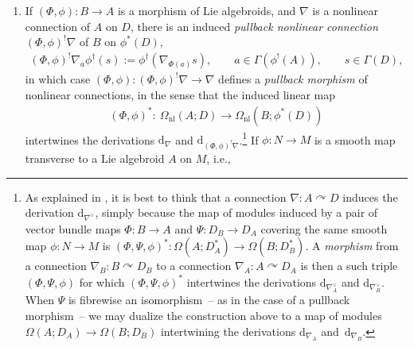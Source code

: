 \documentclass[pdftex]{sigma}
\numberwithin{equation}{section}
\newcommand{\rmap}{\longrightarrow}
\newcommand{\acts}{\curvearrowright}
\newcommand{\C}{\mathbb{C}}
\newcommand{\dd}{\mathrm{d}}
\newcommand{\8}{\infty}
\begin{document}
\begin{enumerate}
\begin{gather*}
\end{gather*}and it is always the case that $\dd_{\nabla}R_{\nabla} = 0$. If $R_{\nabla}=0$, we call $\nabla$ a \emph{nonlinear representation}. Because the supertrace $\operatorname{Tr}_s(T)=\operatorname{Tr}(T_{00})-\operatorname{Tr}(T_{11})$ induces a linear map intertwining derivations,\begin{gather*}\operatorname{Tr}_s \colon \ \Omega_{\mathrm{nl}}(A;\operatorname{End}(D)) \rmap \Omega_{\mathrm{nl}}(A;\C), \qquad \dd_A\operatorname{Tr}_s = \operatorname{Tr}_s\dd_{\nabla},\end{gather*}it follows in general that $\operatorname{Tr}_s\big(R_{\nabla}^q\big) \in \Omega^{2q}_{\mathrm{nl}}(A;\C)$ are $\dd_A$-closed for every integer $q$; see \cite{CrainicNL}.
 \item If $(\Phi,\phi)\colon B \to A$ is a morphism of Lie algebroids, and $\nabla$ is a nonlinear connection of $A$ on $D$, there is an induced \emph{pullback nonlinear connection} $(\Phi,\phi)^!\nabla$ of $B$ on $\phi^*(D)$,
 \begin{align*}\label{eq : pullback connection}
 (\Phi,\phi)^!\nabla_{a}\phi^{\dagger}(s):=\phi^{\dagger}(\nabla_{\Phi(a)}s), \qquad a \in \Gamma(\phi^!(A)), \qquad s \in \Gamma(D),
 \end{align*}in which case $(\Phi,\phi)\colon (\Phi,\phi)^!\nabla \to \nabla$ defines a \emph{pullback morphism} of nonlinear connections, in the sense that the induced linear map
 \begin{gather*}
 (\Phi,\phi)^*\colon \ \Omega_{\mathrm{nl}}(A;D)\to \Omega_{\mathrm{nl}}(B;\phi^*(D))
 \end{gather*}intertwines the derivations $\dd_{\nabla}$ and $\dd_{(\Phi,\phi)^!\nabla}$.\footnote{As explained in \cite{YvetteLaurentAlan}, it is best to think that a connection $\nabla \colon A \acts D$ induces the derivation $\dd_{\nabla^{\vee}}$, simply because the map of modules induced by a pair of vector bundle maps $\Phi\colon B \to A$ and $\Psi\colon D_B \to D_A$ covering the same smooth map $\phi\colon N \to M$ is $(\Phi,\Psi,\phi)^*\colon \Omega(A;D_A^*) \to \Omega(B;D_B^*)$. A \emph{morphism} from a connection $\nabla_B\colon B \acts D_B$ to a connection $\nabla_A \colon A \acts D_A$ is then a such triple $(\Phi,\Psi,\phi)$ for which $(\Phi,\Psi,\phi)^*$ intertwines the derivations $\dd_{\nabla^{\vee}_A}$ and $\dd_{\nabla^{\vee}_B}$. When $\Psi$ is fibrewise an isomorphism~-- as in the case of a pullback morphism~-- we may dualize the construction above to a map of modules $\Omega(A;D_A) \to \Omega(B;D_B)$ intertwining the derivations $\dd_{\nabla_A}$ and~$\dd_{\nabla_B}$.} If $\phi\colon N \to M$ is a smooth map transverse to a Lie algebroid $A$ on $M$, i.e.,

\end{enumerate}
\end{document}
